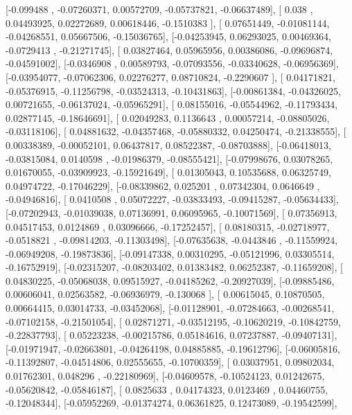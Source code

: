 \documentclass{article}
\begin{document}
       [-0.099488  , -0.07260371,  0.00572709, -0.05737821, -0.06637489],
       [ 0.038     ,  0.04493925,  0.02272689,  0.00618446, -0.1510383 ],
       [ 0.07651449, -0.01081144, -0.04268551,  0.05667506, -0.15036765],
       [-0.04253945,  0.06293025,  0.00469364, -0.0729413 , -0.21271745],
       [ 0.03827464,  0.05965956,  0.00386086, -0.09696874, -0.04591002],
       [-0.0346908 ,  0.00589793, -0.07093556, -0.03340628, -0.06956369],
       [-0.03954077, -0.07062306,  0.02276277,  0.08710824, -0.2290607 ],
       [ 0.04171821, -0.05376915, -0.11256798, -0.03524313, -0.10431863],
       [-0.00861384, -0.04326025,  0.00721655, -0.06137024, -0.05965291],
       [ 0.08155016, -0.05544962, -0.11793434,  0.02877145, -0.18646691],
       [ 0.02049283,  0.1136643 ,  0.00057214, -0.08805026, -0.03118106],
       [ 0.04881632, -0.04357468, -0.05880332,  0.04250474, -0.21338555],
       [ 0.00338389, -0.00052101,  0.06437817,  0.08522387, -0.08703888],
       [-0.06418013, -0.03815084,  0.0140598 , -0.01986379, -0.08555421],
       [-0.07998676,  0.03078265,  0.01670055, -0.03909923, -0.15921649],
       [ 0.01305043,  0.10535688,  0.06325749,  0.04974722, -0.17046229],
       [-0.08339862,  0.025201  ,  0.07342304,  0.0646649 , -0.04946816],
       [ 0.0410508 ,  0.05072227, -0.03833493, -0.09415287, -0.05634433],
       [-0.07202943, -0.01039038,  0.07136991,  0.06095965, -0.10071569],
       [ 0.07356913,  0.04517453,  0.0124869 ,  0.03096666, -0.17252457],
       [ 0.08180315, -0.02718977, -0.0518821 , -0.09814203, -0.11303498],
       [-0.07635638, -0.0443846 , -0.11559924, -0.06949208, -0.19873836],
       [-0.09147338,  0.00310295, -0.05121996,  0.03305514, -0.16752919],
       [-0.02315207, -0.08203402,  0.01383482,  0.06252387, -0.11659208],
       [ 0.04830225, -0.05068038,  0.09515927, -0.04185262, -0.20927039],
       [-0.09885486,  0.00606041,  0.02563582, -0.06936979, -0.130068  ],
       [ 0.00615045,  0.10870505,  0.00664415,  0.03014733, -0.03452068],
       [-0.01128901, -0.07284663, -0.00268541, -0.07102158, -0.21501054],
       [ 0.02871271, -0.03512195, -0.10620219, -0.10842759, -0.22837793],
       [ 0.05223238, -0.00215786,  0.05184616,  0.07237887, -0.09407131],
       [-0.01971947, -0.02663801, -0.04264198,  0.04885885, -0.19612796],
       [-0.06005816, -0.11392807, -0.04514806,  0.02555655, -0.10700359],
       [ 0.03037951,  0.09802034,  0.01762301,  0.048296  , -0.22180969],
       [-0.04609578, -0.10524123,  0.01242675, -0.05620842, -0.05846187],
       [ 0.0825633 ,  0.04174323,  0.0123469 ,  0.04460755, -0.12048344],
       [-0.05952269, -0.01374274,  0.06361825,  0.12473089, -0.19542599],
\end{document}
